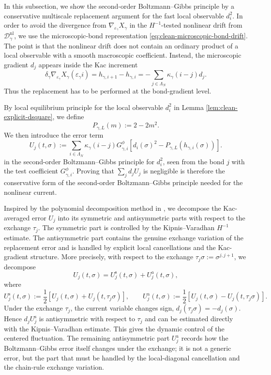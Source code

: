 \documentclass{article}
\begin{document}
In this subsection, we show the second-order Boltzmann–Gibbs principle by a conservative multiscale replacement argument for the fast local observable $d^2_i$.
In order to avoid the divergence from $\nabla_{\varepsilon_{\gamma}} X_{\gamma}$ in the \(H^{-1}\)-tested nonlinear drift from $\mathcal D_\gamma^{\mathrm{nl}}$, we use the microscopic-bond representation \eqref{eq:clean-microscopic-bond-drift}.
The point is that the nonlinear drift does not contain an ordinary product of a local observable with a smooth macroscopic coefficient.  
Instead, the microscopic gradient \(d_j\) appears inside the Kac increment
\[
 \delta_{\gamma} \nabla_{\varepsilon_{\gamma}} X_{\gamma}(\varepsilon_{\gamma} i) = h_{\gamma,i+1}-h_{\gamma,i}
=-\sum_{j \in \Lambda_N}\kappa_\gamma(i-j)d_j .
\]
Thus the replacement has to be performed at the bond-gradient level.  

By local equilibrium principle for the local observable $d^2_i$ in Lemma \ref{lem:clean-explicit-dsquare}, we define
\[
P_{\gamma,L}(m):= 2 -2m^2.
\]
We then introduce the error term
\[
U_j(t,\sigma) := \sum_{i \in \Lambda_N}\kappa_\gamma(i-j)G_{\gamma,i}^{\phi} \left[d_i(\sigma)^2-P_{\gamma,L}(h_{\gamma,i}(\sigma))\right].
\]
in the second-order Boltzmann--Gibbs principle for
\(d_i^2\), seen from the bond \(j\) with the test coefficient \(G_{\gamma,i}^{\phi}\).
Proving that \(\sum_j d_jU_j\) is negligible is therefore the conservative form of the second-order Boltzmann--Gibbs principle needed for the nonlinear current.



Inspired by the polynomial decomposition method in \cite{G2017}, we decompose the Kac-averaged error \(U_j\) into its symmetric and antisymmetric
parts with respect to the exchange \(\tau_j\).  The symmetric part is controlled
by the Kipnis--Varadhan \(H^{-1}\) estimate. The antisymmetric part contains the genuine
exchange variation of the replacement error and is handled by explicit local cancellations and the Kac-gradient structure.
More precisely, with respect to the exchange \(\tau_j\sigma:=\sigma^{j,j+1}\), we decompose
\[
U_j(t,\sigma)=U_j^{\mathrm s}(t,\sigma)+U_j^{\mathrm a}(t,\sigma),
\]
where
\[
U_j^{\mathrm s}(t,\sigma)
:=
\frac12\left[U_j(t,\sigma)+U_j(t,\tau_j\sigma)\right],
\qquad
U_j^{\mathrm a}(t,\sigma)
:=
\frac12\left[U_j(t,\sigma)-U_j(t,\tau_j\sigma)\right].
\]
Under the exchange \(\tau_j\), the current variable changes sign, \(d_j(\tau_j\sigma)=-d_j(\sigma)\).  Hence \(d_jU_j^{\mathrm s}\) is antisymmetric with respect to \(\tau_j\) and can be estimated directly with the Kipnis--Varadhan estimate.  This gives the dynamic control of the centered fluctuation.  The remaining  antisymmetric part \(U_j^{\mathrm a}\) records how
the Boltzmann–Gibbs error itself changes under the exchange; it is not a generic error, but the part that must be handled by the local-diagonal cancellation and the
chain-rule exchange variation.
\end{document}
